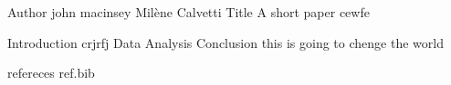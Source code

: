 Author john macinsey Milène Calvetti 
Title A short paper cewfe

Introduction crjrfj  
Data 
Analysis
Conclusion this is going to chenge the world

refereces 
ref.bib

